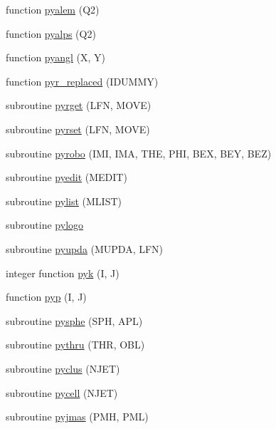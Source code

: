 \begin{DoxyCompactItemize}
function \hyperlink{pythia-6_84_824_8f_ad950c8536b8d340b350441139b4b309e}{pyalem} (Q2)
\item 
function \hyperlink{pythia-6_84_824_8f_a29c95baea28af87f8639a7f77a68edc5}{pyalps} (Q2)
\item 
function \hyperlink{pythia-6_84_824_8f_aa8c99978a55999fa0b1fd2a946d8553a}{pyangl} (X, Y)
\item 
function \hyperlink{pythia-6_84_824_8f_ace6d89d3e1eb016817f7cdced0f69c90}{pyr\+\_\+replaced} (I\+D\+U\+M\+MY)
\item 
subroutine \hyperlink{pythia-6_84_824_8f_a802d1a9a29fd3ada7eb9fefb6ef6ee90}{pyrget} (L\+FN, M\+O\+VE)
\item 
subroutine \hyperlink{pythia-6_84_824_8f_a7be392ff7afd3383f822dedc45582fe7}{pyrset} (L\+FN, M\+O\+VE)
\item 
subroutine \hyperlink{pythia-6_84_824_8f_a98ffa3df00dbe1c8a9944e3453e44580}{pyrobo} (I\+MI, I\+MA, T\+HE, P\+HI, B\+EX, B\+EY, B\+EZ)
\item 
subroutine \hyperlink{pythia-6_84_824_8f_a24316692a5e74fd624bf30b67b745bc3}{pyedit} (M\+E\+D\+IT)
\item 
subroutine \hyperlink{pythia-6_84_824_8f_acc54128638bbd93cf630e1576f91d443}{pylist} (M\+L\+I\+ST)
\item 
subroutine \hyperlink{pythia-6_84_824_8f_a56718d08dbb42b3b978fc9b5bd6970e6}{pylogo}
\item 
subroutine \hyperlink{pythia-6_84_824_8f_af3fa5a55b3c997c4b9528497a6c9d96d}{pyupda} (M\+U\+P\+DA, L\+FN)
\item 
integer function \hyperlink{pythia-6_84_824_8f_ac6c322b0c629a97954c1221c422609e7}{pyk} (I, J)
\item 
function \hyperlink{pythia-6_84_824_8f_a6cee1eea51c820d9e90932c9eca205b7}{pyp} (I, J)
\item 
subroutine \hyperlink{pythia-6_84_824_8f_ab34dcd0761aa566123f75cfdfb7c752b}{pysphe} (S\+PH, A\+PL)
\item 
subroutine \hyperlink{pythia-6_84_824_8f_ab33021ba4e1530eaf22726fa027d1f24}{pythru} (T\+HR, O\+BL)
\item 
subroutine \hyperlink{pythia-6_84_824_8f_ac823bfab0c9338203123a1cab68ea330}{pyclus} (N\+J\+ET)
\item 
subroutine \hyperlink{pythia-6_84_824_8f_abe45dc5a53d53b489813ee6668dfe0b5}{pycell} (N\+J\+ET)
\item 
subroutine \hyperlink{pythia-6_84_824_8f_a025d8a525c7023066fc3aad781f71e75}{pyjmas} (P\+MH, P\+ML)
\item 

\end{DoxyCompactItemize}
